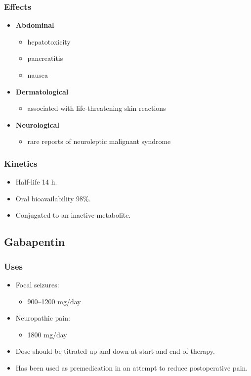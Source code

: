 \documentclass[11pt,a4paper]{article}
\begin{document}
\subsubsection{Effects}
\begin{itemize}
  \item \textbf{Abdominal}
  \begin{itemize}
    \item hepatotoxicity
    \item pancreatitis
    \item nausea
  \end{itemize}
  \item \textbf{Dermatological}
  \begin{itemize}
    \item associated with life-threatening skin reactions
  \end{itemize}
  \item \textbf{Neurological}
  \begin{itemize}
    \item rare reports of neuroleptic malignant syndrome
  \end{itemize}
\end{itemize}

\subsubsection{Kinetics}
\begin{itemize}
  \item Half-life 14 h.
  \item Oral bioavailability 98\%.
  \item Conjugated to an inactive metabolite.
\end{itemize}

\subsection{Gabapentin}

\subsubsection{Uses}
\begin{itemize}
  \item Focal seizures:
  \begin{itemize}
    \item 900--1200 mg/day
  \end{itemize}
  \item Neuropathic pain:
  \begin{itemize}
    \item 1800 mg/day
  \end{itemize}
  \item Dose should be titrated up and down at start and end of therapy.
  \item Has been used as premedication in an attempt to reduce postoperative pain.
\end{itemize}
\end{document}
